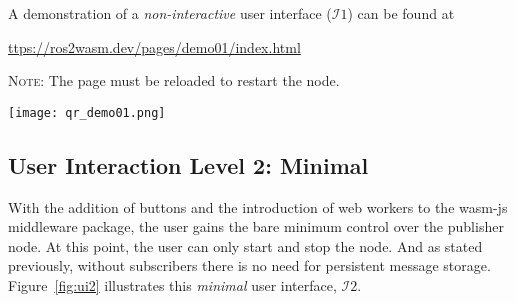         \vspace{2em}
        \begin{tcolorbox}[title=Example 4]
            \begin{minipage}[t]{0.87\linewidth}
                \vspace*{0pt}
                A demonstration of a \textit{non-interactive} user interface ($\mathcal{I}1$) can be found at
                
                \href{https://ros2wasm.dev/pages/demo01/index.html}{\textsf{ttps://ros2wasm.dev/pages/demo01/index.html}}

                \textsc{Note:} The page must be reloaded to restart the node.
            \end{minipage}\hfill%
            \begin{minipage}[t]{0.1\linewidth}
                \vspace*{0pt}
                \texttt{[image: qr\_demo01.png]}
            \end{minipage}
        \end{tcolorbox}

        \subsection{User Interaction Level 2: Minimal}

        With the addition of buttons and the introduction of web workers to the \textsf{wasm-js} middleware package, the user gains the bare minimum control over the publisher node. At this point, the user can only start and stop the node. And as stated previously, without subscribers there is no need for persistent message storage. Figure~\ref{fig:ui2} illustrates this \textit{minimal} user interface, $\mathcal{I}2$.

